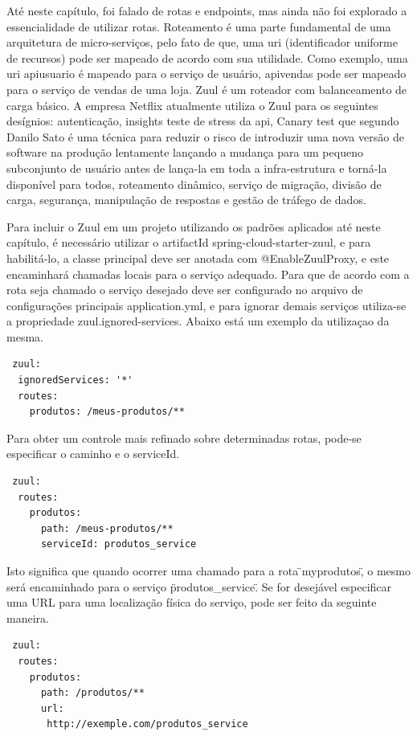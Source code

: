 \documentclass[journal]{IEEEtran}
\begin{document}
Até neste capítulo, foi falado de rotas e endpoints, mas ainda não foi explorado a essencialidade de utilizar rotas. Roteamento é uma parte fundamental de uma arquitetura de micro-serviços, pelo fato de que, uma uri (identificador uniforme de recursos) pode ser mapeado de acordo com sua utilidade. Como exemplo, uma uri \/api\/usuario é mapeado para o serviço de usuário, \/api\/vendas pode ser mapeado para o serviço de vendas de uma loja. Zuul é um roteador com balanceamento de carga básico. A empresa Netflix atualmente utiliza o Zuul para os seguintes desígnios: autenticação, insights teste de stress da api, Canary test que segundo Danilo Sato \cite{danilosato2017} é uma técnica para reduzir o risco de introduzir uma nova versão de software na produção lentamente lançando a mudança para um pequeno subconjunto de usuário antes de lança-la em toda a infra-estrutura e torná-la disponível para todos, roteamento dinâmico, serviço de migração, divisão de carga, segurança, manipulação de respostas e gestão de tráfego de dados.

Para incluir o Zuul em um projeto utilizando os padrões aplicados até neste capítulo, é necessário utilizar o artifactId spring-cloud-starter-zuul, e para habilitá-lo, a classe principal deve ser anotada com @EnableZuulProxy, e este encaminhará chamadas locais para o serviço adequado. Para que de acordo com a rota seja chamado o serviço desejado deve ser configurado no arquivo de configurações principais application.yml, e para ignorar demais serviços utiliza-se a propriedade zuul.ignored-services. Abaixo está um exemplo da utilizaçao da mesma.

\begin{verbatim}
 zuul:
  ignoredServices: '*'
  routes:
    produtos: /meus-produtos/**
\end{verbatim}

Para obter um controle mais refinado sobre determinadas rotas, pode-se especificar o caminho e o serviceId.

\begin{verbatim}
 zuul:
  routes:
    produtos:
      path: /meus-produtos/**
      serviceId: produtos_service
\end{verbatim}

Isto significa que quando ocorrer uma chamado para a rota \"\/myprodutos\", o mesmo será encaminhado para o serviço \"produtos\_service\". Se for desejável especificar uma URL para uma localização física do serviço, pode ser feito da seguinte maneira.

\begin{verbatim}
 zuul:
  routes:
    produtos:
      path: /produtos/**
      url: 
       http://exemple.com/produtos_service
\end{verbatim}
\end{document}
